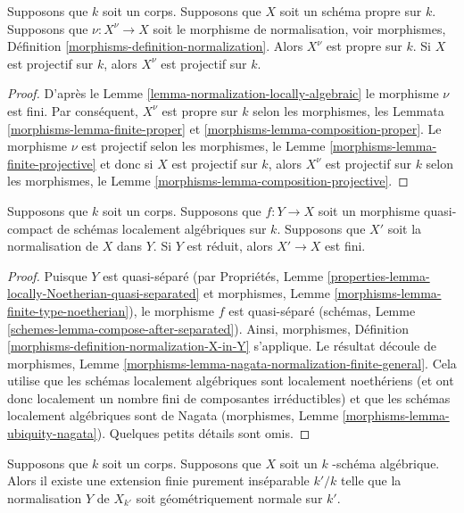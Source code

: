 \begin{lemma}
\label{lemma-normalize-projective}
Supposons que $k$ soit un corps. Supposons que $X$ soit un
schéma propre sur $k$. Supposons que $\nu : X^\nu \to X$ soit le
morphisme de normalisation, voir morphismes, Définition
\ref{morphisms-definition-normalization}. Alors $X^\nu$ est propre sur
$k$. Si $X$ est projectif sur $k$, alors $X^\nu$ est projectif sur $k$.
\end{lemma}

\begin{proof}
D'après le Lemme \ref{lemma-normalization-locally-algebraic}
le morphisme $\nu$ est fini. Par conséquent, $X^\nu$ est propre
sur $k$ selon les morphismes, les Lemmata
\ref{morphisms-lemma-finite-proper} et
\ref{morphisms-lemma-composition-proper}. Le morphisme $\nu$ est projectif
selon les morphismes, le Lemme \ref{morphisms-lemma-finite-projective} et
donc si $X$ est projectif sur $k$, alors $X^\nu$ est projectif sur $k$
selon les morphismes, le Lemme \ref{morphisms-lemma-composition-projective}.
\end{proof}

\begin{lemma}
\label{lemma-relative-normalization-finite}
Supposons que $k$ soit un corps. Supposons que $f : Y \to X$
soit un morphisme quasi-compact de schémas localement
algébriques sur $k$. Supposons que $X'$ soit la normalisation
de $X$ dans $Y$. Si $Y$ est réduit, alors $X' \to X$ est fini.
\end{lemma}

\begin{proof}
Puisque $Y$ est quasi-séparé (par Propriétés, Lemme
\ref{properties-lemma-locally-Noetherian-quasi-separated}
et morphismes, Lemme
\ref{morphisms-lemma-finite-type-noetherian}), le morphisme $f$
est quasi-séparé (schémas, Lemme
\ref{schemes-lemma-compose-after-separated}). Ainsi, morphismes,
Définition \ref{morphisms-definition-normalization-X-in-Y}
s'applique. Le résultat découle de morphismes, Lemme
\ref{morphisms-lemma-nagata-normalization-finite-general}. Cela utilise
que les schémas localement algébriques sont localement noethériens (et
ont donc localement un nombre fini de composantes irréductibles) et que
les schémas localement algébriques sont de Nagata (morphismes, Lemme
\ref{morphisms-lemma-ubiquity-nagata}). Quelques petits détails sont omis.
\end{proof}

\begin{lemma}
\label{lemma-finite-extension-geometrically-normal}
Supposons que $k$ soit un corps. Supposons que $X$ soit un $k$ -schéma
algébrique. Alors il existe une extension finie purement inséparable $k'/k$
telle que la normalisation $Y$ de $X_{k'}$ soit géométriquement normale sur $k'$.
\end{lemma}


